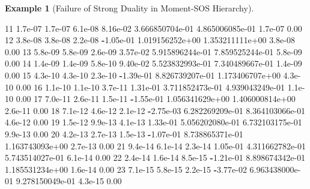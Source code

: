 \documentclass[
]{book}
\newenvironment{Shaded}{\begin{snugshade}}{\end{snugshade}}
\newcommand{\FloatTok}[1]{\textcolor[rgb]{0.00,0.00,0.81}{#1}}
\newcommand{\OperatorTok}[1]{\textcolor[rgb]{0.81,0.36,0.00}{\textbf{#1}}}
\theoremstyle{definition}
\theoremstyle{definition}
\newtheorem{example}{Example}[chapter]
\theoremstyle{definition}
\theoremstyle{definition}
\theoremstyle{remark}
\begin{document}
\begin{example}[Failure of Strong Duality in Moment-SOS Hierarchy]
\begin{Shaded}
\begin{Highlighting}[]
\FloatTok{11}  \FloatTok{1.7e{-}07}  \FloatTok{1.7e{-}07}  \FloatTok{6.1e{-}08}  \FloatTok{8.16e{-}02}   \FloatTok{3.666850704e{-}01}   \FloatTok{4.865006085e{-}01}   \FloatTok{1.7e{-}07}  \FloatTok{0.00}  
\FloatTok{12}  \FloatTok{3.8e{-}08}  \FloatTok{3.8e{-}08}  \FloatTok{2.2e{-}08}  \OperatorTok{{-}}\FloatTok{1.05e{-}01}  \FloatTok{1.019156252e+00}   \FloatTok{1.353211111e+00}   \FloatTok{3.8e{-}08}  \FloatTok{0.00}  
\FloatTok{13}  \FloatTok{5.8e{-}09}  \FloatTok{5.8e{-}09}  \FloatTok{2.6e{-}09}  \FloatTok{3.57e{-}02}   \FloatTok{5.915896244e{-}01}   \FloatTok{7.859525244e{-}01}   \FloatTok{5.8e{-}09}  \FloatTok{0.00}  
\FloatTok{14}  \FloatTok{1.4e{-}09}  \FloatTok{1.4e{-}09}  \FloatTok{5.8e{-}10}  \FloatTok{9.40e{-}02}   \FloatTok{5.523832993e{-}01}   \FloatTok{7.340489667e{-}01}   \FloatTok{1.4e{-}09}  \FloatTok{0.00}  
\FloatTok{15}  \FloatTok{4.3e{-}10}  \FloatTok{4.3e{-}10}  \FloatTok{2.3e{-}10}  \OperatorTok{{-}}\FloatTok{1.39e{-}01}  \FloatTok{8.826739207e{-}01}   \FloatTok{1.173406707e+00}   \FloatTok{4.3e{-}10}  \FloatTok{0.00}  
\FloatTok{16}  \FloatTok{1.1e{-}10}  \FloatTok{1.1e{-}10}  \FloatTok{3.7e{-}11}  \FloatTok{1.31e{-}01}   \FloatTok{3.711852473e{-}01}   \FloatTok{4.939043249e{-}01}   \FloatTok{1.1e{-}10}  \FloatTok{0.00}  
\FloatTok{17}  \FloatTok{7.0e{-}11}  \FloatTok{2.6e{-}11}  \FloatTok{1.5e{-}11}  \OperatorTok{{-}}\FloatTok{1.55e{-}01}  \FloatTok{1.056341629e+00}   \FloatTok{1.406000814e+00}   \FloatTok{2.6e{-}11}  \FloatTok{0.00}  
\FloatTok{18}  \FloatTok{7.1e{-}12}  \FloatTok{4.6e{-}12}  \FloatTok{2.1e{-}12}  \OperatorTok{{-}}\FloatTok{2.75e{-}03}  \FloatTok{6.282269209e{-}01}   \FloatTok{8.364103066e{-}01}   \FloatTok{4.6e{-}12}  \FloatTok{0.00}  
\FloatTok{19}  \FloatTok{1.5e{-}12}  \FloatTok{9.9e{-}13}  \FloatTok{4.1e{-}13}  \FloatTok{1.33e{-}01}   \FloatTok{5.056202080e{-}01}   \FloatTok{6.732103175e{-}01}   \FloatTok{9.9e{-}13}  \FloatTok{0.00}  
\FloatTok{20}  \FloatTok{4.2e{-}13}  \FloatTok{2.7e{-}13}  \FloatTok{1.5e{-}13}  \OperatorTok{{-}}\FloatTok{1.07e{-}01}  \FloatTok{8.738865371e{-}01}   \FloatTok{1.163743093e+00}   \FloatTok{2.7e{-}13}  \FloatTok{0.00}  
\FloatTok{21}  \FloatTok{9.4e{-}14}  \FloatTok{6.1e{-}14}  \FloatTok{2.3e{-}14}  \FloatTok{1.05e{-}01}   \FloatTok{4.311662782e{-}01}   \FloatTok{5.743514027e{-}01}   \FloatTok{6.1e{-}14}  \FloatTok{0.00}  
\FloatTok{22}  \FloatTok{2.4e{-}14}  \FloatTok{1.6e{-}14}  \FloatTok{8.5e{-}15}  \OperatorTok{{-}}\FloatTok{1.21e{-}01}  \FloatTok{8.898674342e{-}01}   \FloatTok{1.185531234e+00}   \FloatTok{1.6e{-}14}  \FloatTok{0.00}  
\FloatTok{23}  \FloatTok{7.1e{-}15}  \FloatTok{5.8e{-}15}  \FloatTok{2.2e{-}15}  \OperatorTok{{-}}\FloatTok{3.77e{-}02}  \FloatTok{6.963438000e{-}01}   \FloatTok{9.278150049e{-}01}   \FloatTok{4.3e{-}15}  \FloatTok{0.00}  

\end{Highlighting}
\end{Shaded}
\end{example}
\end{document}
